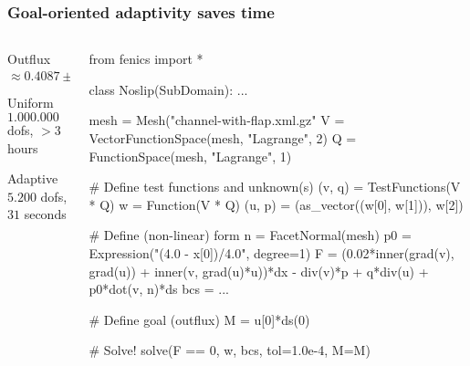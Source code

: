 \begin{frame}[fragile, shrink=50]
  \frametitle{Goal-oriented adaptivity saves time}
     \vspace{-2mm}
     \begin{center}
     \end{center}
     \vspace{-8mm}
  \begin{columns}
  \vspace{-10mm}
    \begin{column}{0.4\textwidth}
      { \huge
        Outflux $\approx 0.4087 \pm 10^{-4}$
      \begin{block}{Uniform}
        $1.000.000$ dofs, $> 3$ hours
      \end{block}
      \begin{block}{Adaptive}
        $5.200$ dofs, $31$ seconds
      \end{block}
      }
\end{column}
\begin{column}{0.6\textwidth}
  \vspace{-12mm}
  \begin{python}
from fenics import *

class Noslip(SubDomain): ...

mesh = Mesh("channel-with-flap.xml.gz"
V = VectorFunctionSpace(mesh, "Lagrange", 2)
Q = FunctionSpace(mesh, "Lagrange", 1)

# Define test functions and unknown(s)
(v, q) = TestFunctions(V * Q)
w = Function(V * Q)
(u, p) = (as_vector((w[0], w[1])), w[2])

# Define (non-linear) form
n = FacetNormal(mesh)
p0 = Expression("(4.0 - x[0])/4.0", degree=1)
F = (0.02*inner(grad(v), grad(u)) + inner(v, grad(u)*u))*dx
    - div(v)*p + q*div(u) + p0*dot(v, n)*ds
bcs = ...

# Define goal (outflux)
M = u[0]*ds(0)

# Solve!
solve(F == 0, w, bcs, tol=1.0e-4, M=M)
  \end{python}
\end{column}
\end{columns}

\end{frame}
